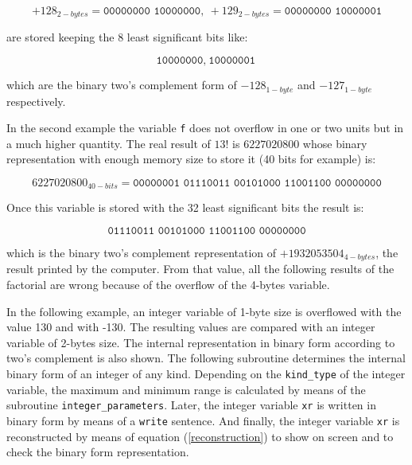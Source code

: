 \begin{equation*}
    +128_{2-bytes} = \texttt{00000000 10000000} ,\:  +129_{2-bytes} = \texttt{00000000 10000001}
\end{equation*}

are stored keeping the 8 least significant bits like:

\begin{equation*}
    \texttt{10000000} ,\:  \texttt{10000001}
\end{equation*}

which are the binary two's complement form of $-128_{1-byte}$ and $-127_{1-byte}$ respectively. 

In the second example the variable \texttt{f} does not overflow in one or two units but in a much 
higher quantity. 
The real result of $13!$ is $6227020800$ whose binary representation with enough memory size to store 
it (40 bits for example) is: 

\begin{equation*}
    6227020800_{40-bits} = \texttt{00000001 01110011 00101000 11001100 00000000} 
\end{equation*}

Once this variable is stored with the 32 least significant bits the result is:

\begin{equation*}
    \texttt{01110011 00101000 11001100 00000000} 
\end{equation*}

which is the binary two's complement representation of $+1932053504_{4-bytes}$, the result printed by the computer. 
From that value, all the following results of the factorial are wrong because of the overflow of the 4-bytes variable. 




In the following example, 
an integer variable of 1-byte size is overflowed with the value 130 and with 
-130. The resulting values are compared with an integer variable of 2-bytes size.  
The internal representation  in binary form according to two's complement is also shown. 
The following subroutine determines the internal binary form of an integer of any kind. 
Depending on the \texttt{kind\_type} of the integer variable, 
the maximum and minimum range is calculated by means of the subroutine \texttt{integer\_parameters}.
Later, the integer variable \texttt{xr} is written in binary form by means of a \texttt{write} sentence. 
And finally, the integer variable \texttt{xr} is reconstructed by means of equation  (\ref{reconstruction})
to show on screen and to check the binary form representation. 

